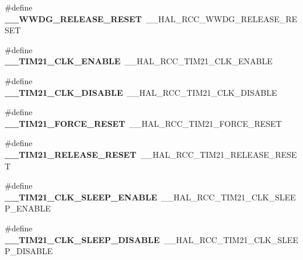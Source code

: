 \begin{DoxyCompactItemize}
\item 
\#define {\bfseries \+\_\+\+\_\+\+W\+W\+D\+G\+\_\+\+R\+E\+L\+E\+A\+S\+E\+\_\+\+R\+E\+S\+ET}~\+\_\+\+\_\+\+H\+A\+L\+\_\+\+R\+C\+C\+\_\+\+W\+W\+D\+G\+\_\+\+R\+E\+L\+E\+A\+S\+E\+\_\+\+R\+E\+S\+ET\hypertarget{group___h_a_l___r_c_c___aliased_ga068a4fec4a2fd9ca223b4d28a0fbc6b8}{}\label{group___h_a_l___r_c_c___aliased_ga068a4fec4a2fd9ca223b4d28a0fbc6b8}

\item 
\#define {\bfseries \+\_\+\+\_\+\+T\+I\+M21\+\_\+\+C\+L\+K\+\_\+\+E\+N\+A\+B\+LE}~\+\_\+\+\_\+\+H\+A\+L\+\_\+\+R\+C\+C\+\_\+\+T\+I\+M21\+\_\+\+C\+L\+K\+\_\+\+E\+N\+A\+B\+LE\hypertarget{group___h_a_l___r_c_c___aliased_ga5e5f6e02491ba4544c8e5e788c9914f9}{}\label{group___h_a_l___r_c_c___aliased_ga5e5f6e02491ba4544c8e5e788c9914f9}

\item 
\#define {\bfseries \+\_\+\+\_\+\+T\+I\+M21\+\_\+\+C\+L\+K\+\_\+\+D\+I\+S\+A\+B\+LE}~\+\_\+\+\_\+\+H\+A\+L\+\_\+\+R\+C\+C\+\_\+\+T\+I\+M21\+\_\+\+C\+L\+K\+\_\+\+D\+I\+S\+A\+B\+LE\hypertarget{group___h_a_l___r_c_c___aliased_ga73cc7df88569f682f8f5dafb8fa76fab}{}\label{group___h_a_l___r_c_c___aliased_ga73cc7df88569f682f8f5dafb8fa76fab}

\item 
\#define {\bfseries \+\_\+\+\_\+\+T\+I\+M21\+\_\+\+F\+O\+R\+C\+E\+\_\+\+R\+E\+S\+ET}~\+\_\+\+\_\+\+H\+A\+L\+\_\+\+R\+C\+C\+\_\+\+T\+I\+M21\+\_\+\+F\+O\+R\+C\+E\+\_\+\+R\+E\+S\+ET\hypertarget{group___h_a_l___r_c_c___aliased_ga6d2dbc31d955310a9360e55fe7748065}{}\label{group___h_a_l___r_c_c___aliased_ga6d2dbc31d955310a9360e55fe7748065}

\item 
\#define {\bfseries \+\_\+\+\_\+\+T\+I\+M21\+\_\+\+R\+E\+L\+E\+A\+S\+E\+\_\+\+R\+E\+S\+ET}~\+\_\+\+\_\+\+H\+A\+L\+\_\+\+R\+C\+C\+\_\+\+T\+I\+M21\+\_\+\+R\+E\+L\+E\+A\+S\+E\+\_\+\+R\+E\+S\+ET\hypertarget{group___h_a_l___r_c_c___aliased_ga9058ce5ea35581c862efa9d0be0a991e}{}\label{group___h_a_l___r_c_c___aliased_ga9058ce5ea35581c862efa9d0be0a991e}

\item 
\#define {\bfseries \+\_\+\+\_\+\+T\+I\+M21\+\_\+\+C\+L\+K\+\_\+\+S\+L\+E\+E\+P\+\_\+\+E\+N\+A\+B\+LE}~\+\_\+\+\_\+\+H\+A\+L\+\_\+\+R\+C\+C\+\_\+\+T\+I\+M21\+\_\+\+C\+L\+K\+\_\+\+S\+L\+E\+E\+P\+\_\+\+E\+N\+A\+B\+LE\hypertarget{group___h_a_l___r_c_c___aliased_ga92b381109bd6db49c8ad5a607ed3a99b}{}\label{group___h_a_l___r_c_c___aliased_ga92b381109bd6db49c8ad5a607ed3a99b}

\item 
\#define {\bfseries \+\_\+\+\_\+\+T\+I\+M21\+\_\+\+C\+L\+K\+\_\+\+S\+L\+E\+E\+P\+\_\+\+D\+I\+S\+A\+B\+LE}~\+\_\+\+\_\+\+H\+A\+L\+\_\+\+R\+C\+C\+\_\+\+T\+I\+M21\+\_\+\+C\+L\+K\+\_\+\+S\+L\+E\+E\+P\+\_\+\+D\+I\+S\+A\+B\+LE\hypertarget{group___h_a_l___r_c_c___aliased_ga2079771896a6ffc761933edb8bcaaa11}{}\label{group___h_a_l___r_c_c___aliased_ga2079771896a6ffc761933edb8bcaaa11}


\end{DoxyCompactItemize}
